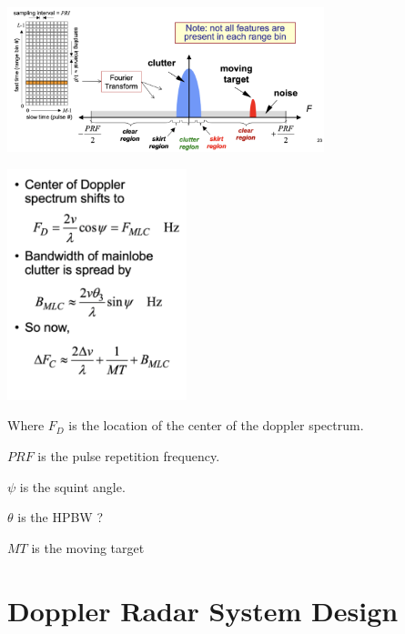 \documentclass[10pt]{article}
\begin{document}
\begin{enumerate}
	\includegraphics[width=0.69\textwidth]{figs/doppler_clutter_spectrum_2.png}
	
	\includegraphics[width=0.39\textwidth]{figs/doppler_clutter_spectrum_3.png}
	
	Where $F_D$ is the location of the center of the doppler spectrum. 
	
	$PRF$ is the pulse repetition frequency.
	
	$\psi$ is the squint angle.
	
	$\theta$ is the HPBW ?
	
	$MT$ is the moving target


\end{enumerate}


\section{Doppler Radar System Design}
\end{document}
